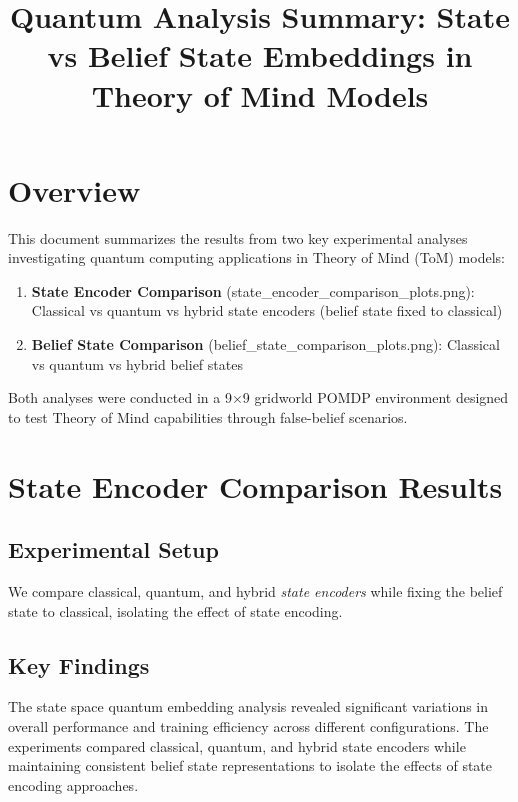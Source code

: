 \documentclass[11pt]{article}
\title{Quantum Analysis Summary: State vs Belief State Embeddings in Theory of Mind Models}
\author{}
\date{}
\begin{document}
\maketitle

\section{Overview}

This document summarizes the results from two key experimental analyses investigating quantum computing applications in Theory of Mind (ToM) models:

\begin{enumerate}
    \item \textbf{State Encoder Comparison} (state\_encoder\_comparison\_plots.png): Classical vs quantum vs hybrid state encoders (belief state fixed to classical)
    \item \textbf{Belief State Comparison} (belief\_state\_comparison\_plots.png): Classical vs quantum vs hybrid belief states
\end{enumerate}

Both analyses were conducted in a 9×9 gridworld POMDP environment designed to test Theory of Mind capabilities through false-belief scenarios.

\section{State Encoder Comparison Results}

\subsection{Experimental Setup}

We compare classical, quantum, and hybrid \emph{state encoders} while fixing the belief state to classical, isolating the effect of state encoding.

\subsection{Key Findings}

The state space quantum embedding analysis revealed significant variations in overall performance and training efficiency across different configurations. The experiments compared classical, quantum, and hybrid state encoders while maintaining consistent belief state representations to isolate the effects of state encoding approaches.
\end{document}
